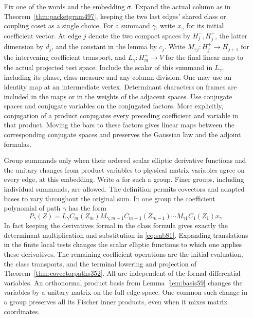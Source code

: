 \documentclass[a4paper,11pt]{article}
\theoremstyle{definition}
\theoremstyle{remark}
\numberwithin{equation}{section}
\begin{document}
Fix one of the words and the embedding \(\sigma\). Expand the
actual column as in Theorem~\ref{thm:packetgram497}, keeping the
two last edges' shared class or coupling coset as a single choice.
For a summand \(\gamma\), write \(x_\gamma\) for its initial
coefficient vector. At edge \(j\) denote the two compact spaces
by \(H_j^-,H_j^+\), the latter dimension by \(d_j\), and the
constant in the lemma by \(c_j\). Write
\(M_{\gamma j}:H_j^+\to H_{j+1}^-\) for the intervening
coefficient transport, and \(L_\gamma:H_m^+\to V\) for the
final linear map to the actual projected test space. Include the
scalar of this summand in \(L_\gamma\), including its phase,
class measure and any column division. One may use an identity
map at an intermediate vertex. Determinant characters on frames
are included in the maps or in the weights of the adjacent
spaces. Use conjugate spaces and conjugate variables on the
conjugated factors. More explicitly, conjugation of a product
conjugates every preceding coefficient and variable in that
product. Moving the bars to these factors gives linear maps
between the corresponding conjugate spaces and preserves the
Gaussian law and the adjoint formulas.

Group summands only when their ordered scalar elliptic derivative
functions and the unitary changes from product variables to
physical matrix variables agree on every edge, at this embedding.
Write \(a\) for such a group. Finer groups, including individual
summands, are allowed. The definition permits covectors and
adapted bases to vary throughout the original sum. In one group
the coefficient polynomial of path \(\gamma\) has the form
\[
 P_\gamma(Z)=L_\gamma C_m(Z_m)M_{\gamma,m-1}
               C_{m-1}(Z_{m-1})\cdots
               M_{\gamma1}C_1(Z_1)x_\gamma .
\]
In fact keeping the derivatives formal in the class formula
gives exactly the determinant multiplication and substitution
in \eqref{eq:sub81}. Expanding translations in the finite local
tests changes the scalar elliptic functions to which one applies
these derivatives. The remaining coefficient operations are the
initial evaluation, the class transports, and the terminal
lowering and projection of Theorem~\ref{thm:covectorpaths352}.
All are independent of the formal differential variables.
An orthonormal product basis from Lemma~\ref{lem:basis59} changes
the variables by a unitary matrix on the full edge space. One
common such change in a group preserves all its Fischer inner
products, even when it mixes matrix coordinates.
\end{document}
